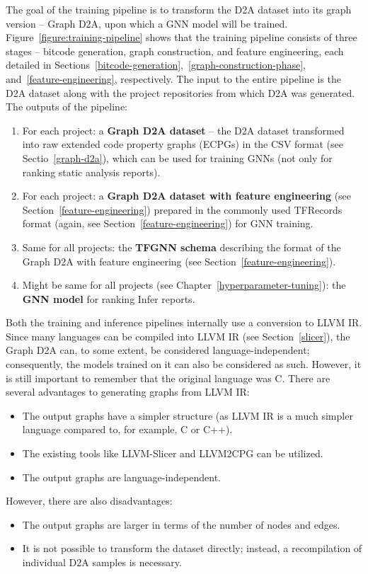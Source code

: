 The goal of the training pipeline is to transform the D2A dataset into its graph version -- Graph D2A, upon which a GNN model will be trained. Figure~\ref{figure:training-pipeline} shows that the training pipeline consists of three stages -- bitcode generation, graph construction, and feature engineering, each detailed in Sections~\ref{bitcode-generation},~\ref{graph-construction-phase}, and~\ref{feature-engineering}, respectively. The input to the entire pipeline is the D2A dataset along with the project repositories from which D2A was generated. The outputs of the pipeline:
\begin{enumerate}
    \item For each project: a \textbf{Graph D2A dataset} -- the D2A dataset transformed into raw extended code property graphs (ECPGs) in the CSV format (see Sectio~\ref{graph-d2a}), which can be used for training GNNs (not only for ranking static analysis reports).
    \item For each project: a \textbf{Graph D2A dataset with feature engineering} (see Section~\ref{feature-engineering}) prepared in the commonly used TFRecords format (again, see Section~\ref{feature-engineering}) for GNN training.
    \item Same for all projects: the \textbf{TFGNN schema} describing the format of the Graph D2A with feature engineering (see Section~\ref{feature-engineering}).
    \item Might be same for all projects (see Chapter~\ref{hyperparameter-tuning}): the \textbf{GNN model} for ranking Infer reports.
\end{enumerate}

Both the training and inference pipelines internally use a conversion to LLVM IR. Since many languages can be compiled into LLVM IR (see Section~\ref{slicer}), the Graph D2A can, to some extent, be considered language-independent; consequently, the models trained on it can also be considered as such. However, it is still important to remember that the original language was C. There are several advantages to generating graphs from LLVM IR:
\begin{itemize}
    \item The output graphs have a simpler structure (as LLVM IR is a much simpler language compared to, for example, C or C++).
    \item The existing tools like LLVM-Slicer and LLVM2CPG can be utilized.
    \item The output graphs are language-independent.
\end{itemize}
However, there are also disadvantages:
\begin{itemize}
    \item The output graphs are larger in terms of the number of nodes and edges.
    \item It is not possible to transform the dataset directly; instead, a recompilation of individual D2A samples is necessary.
\end{itemize}



